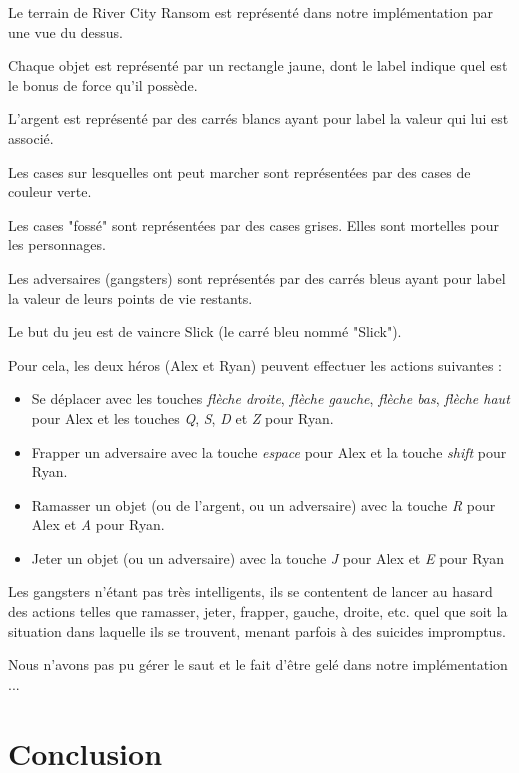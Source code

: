 \documentclass[a4paper, 11pt, notitlepage]{article}
\begin{document}
Le terrain de River City Ransom est représenté dans notre implémentation par une vue du dessus.

Chaque objet est représenté par un rectangle jaune, dont le label indique quel est le bonus de force qu'il possède. 

L'argent est représenté par des carrés blancs ayant pour label la valeur qui lui est associé. 

Les cases sur lesquelles ont peut marcher sont représentées par des cases de couleur verte.

Les cases "fossé" sont représentées par des cases grises. Elles sont mortelles pour les personnages.

Les adversaires (gangsters) sont représentés par des carrés bleus ayant pour label la valeur de leurs points de vie restants.  

Le but du jeu est de vaincre Slick (le carré bleu nommé "Slick").

Pour cela, les deux héros (Alex et Ryan) peuvent effectuer les actions suivantes : 

\begin{itemize}
\item Se déplacer avec les touches \emph{flèche droite}, \emph{flèche gauche}, \emph{flèche bas}, \emph{flèche haut} pour Alex et les touches \emph{Q}, \emph{S}, \emph{D} et \emph{Z} pour Ryan.
\item Frapper un adversaire avec la touche \emph{espace} pour Alex et la touche \emph{shift} pour Ryan.
\item Ramasser un objet (ou de l'argent, ou un adversaire) avec la touche \emph{R} pour Alex et \emph{A} pour Ryan.
\item Jeter un objet (ou un adversaire) avec la touche \emph{J} pour Alex et \emph{E} pour Ryan
\end{itemize}

Les gangsters n'étant pas très intelligents, ils se contentent de lancer au hasard des actions telles que ramasser, jeter, frapper, gauche, droite, etc. quel que soit la situation dans laquelle ils se trouvent, menant parfois à des suicides impromptus.

Nous n'avons pas pu gérer le saut et le fait d'être gelé dans notre implémentation ... 



\section*{Conclusion}
\end{document}
